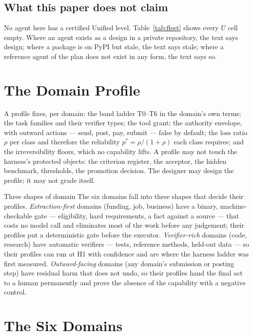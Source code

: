 \documentclass[11pt]{article}
\theoremstyle{definition}
\begin{document}
\subsection{What this paper does not claim}

No agent here has a certified Unified level. Table~\ref{tab:fleet} shows every $U$ cell empty. Where an agent exists as a design in a private repository, the text says design; where a package is on PyPI but stale, the text says stale; where a reference agent of the plan does not exist in any form, the text says so.

\section{The Domain Profile}\label{sec:profile}

A profile fixes, per domain: the band ladder T0--T6 in the domain's own terms; the task families and their verifier types; the tool grant; the authority envelope, with outward actions --- send, post, pay, submit --- false by default; the loss ratio $\rho$ per class and therefore the reliability $p^{*} = \rho/(1+\rho)$ each class requires; and the irreversibility floors, which no capability lifts. A profile may not touch the harness's protected objects: the criterion register, the acceptor, the hidden benchmark, thresholds, the promotion decision. The designer may design the profile; it may not grade itself.

\begin{claimbox}{Three shapes of domain}
The six domains fall into three shapes that decide their profiles. \emph{Extraction-first} domains (funding, job, business) have a binary, machine-checkable gate --- eligibility, hard requirements, a fact against a source --- that costs no model call and eliminates most of the work before any judgement; their profiles put a deterministic gate before the executor. \emph{Verifier-rich} domains (code, research) have automatic verifiers --- tests, reference methods, held-out data --- so their profiles can run at H1 with confidence and are where the harness ladder was first measured. \emph{Outward-facing} domains (any domain's submission or posting step) have residual harm that does not undo, so their profiles hand the final act to a human permanently and prove the absence of the capability with a negative control.
\end{claimbox}

\section{The Six Domains}\label{sec:domains}
\end{document}
